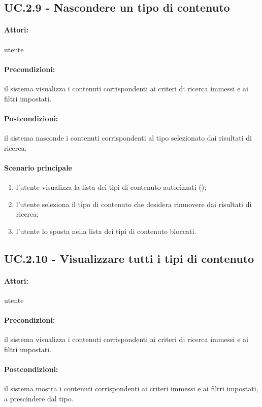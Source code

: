 \documentclass[10pt,a4paper,headinclude,footinclude,hidelinks]{scrreprt} %
\begin{document}
	\subsection[UC.2.9]{UC.2.9 - Nascondere un tipo di contenuto}
	\label{ch:stage:ar:uc:2_9}
	\paragraph{Attori:} utente
	\paragraph{Precondizioni:} il sistema visualizza i contenuti corrispondenti ai criteri di ricerca immessi e ai filtri impostati.
	\paragraph{Postcondizioni:} il sistema nasconde i contenuti corrispondenti al tipo selezionato dai risultati di ricerca.
	\paragraph{Scenario principale}
	\begin{enumerate}
	\item l'utente visualizza la lista dei tipi di contenuto autorizzati ();
	\item l'utente seleziona il tipo di contenuto che desidera rimuovere dai risultati di ricerca;
	\item l'utente lo sposta nella lista dei tipi di contenuto bloccati.
	\end{enumerate}

	\subsection[UC.2.10]{UC.2.10 - Visualizzare tutti i tipi di contenuto}
	\label{ch:stage:ar:uc:2_10}
	\paragraph{Attori:} utente
	\paragraph{Precondizioni:} il sistema visualizza i contenuti corrispondenti ai criteri di ricerca immessi e ai filtri impostati.
	\paragraph{Postcondizioni:} il sistema mostra i contenuti corrispondenti ai criteri immessi e ai filtri impostati, a prescindere dal tipo.
\end{document}
